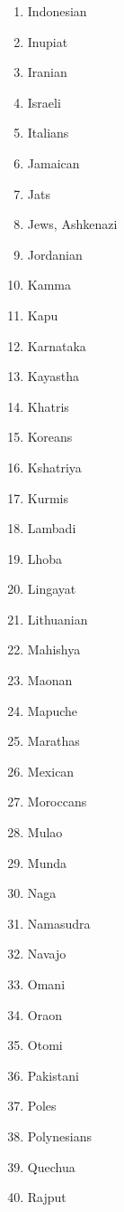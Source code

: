 {\begin{multicols}{4}
\begin{enumerate}
            \item Indonesian
            \item Inupiat
            \item Iranian
            \item Israeli
            \item Italians
            \item Jamaican
            \item Jats
            \item Jews, Ashkenazi
            \item Jordanian
            \item Kamma
            \item Kapu
            \item Karnataka
            \item Kayastha
            \item Khatris
            \item Koreans
            \item Kshatriya
            \item Kurmis
            \item Lambadi
            \item Lhoba
            \item Lingayat
            \item Lithuanian
            \item Mahishya
            \item Maonan
            \item Mapuche
            \item Marathas
            \item Mexican
            \item Moroccans
            \item Mulao
            \item Munda
            \item Naga
            \item Namasudra
            \item Navajo
            \item Omani
            \item Oraon
            \item Otomi
            \item Pakistani
            \item Poles
            \item Polynesians
            \item Quechua
            \item Rajput

\end{enumerate}
\end{multicols}}
